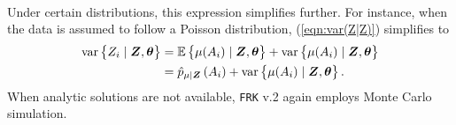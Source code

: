 \documentclass[12pt,a4paper]{article}
\begin{document}
\begin{appendices}
\begin{align}
\end{align}
Under certain distributions, this expression simplifies further. For instance, when the data is assumed to follow a Poisson distribution, (\ref{eqn:var(Z|Z)}) simplifies to 
\begin{align*}
 \varCurly{Z_i \mid \vec{Z}, \vec{\theta}}
&=
    \ECurly{\muZgivenY{A_i} \mid \vec{Z}, \vec{\theta}} 
    + 
    \varCurly{ \muZgivenY{A_i} \mid \vec{Z}, \vec{\theta}}\\
&=
\pmugivenZ{A_i}
    + 
    \varCurly{ \muZgivenY{A_i} \mid \vec{Z}, \vec{\theta}}.
\end{align*}
 When analytic solutions are not available, \texttt{FRK} v.2 again employs Monte Carlo simulation. 
  
 











\end{appendices}
\end{document}
